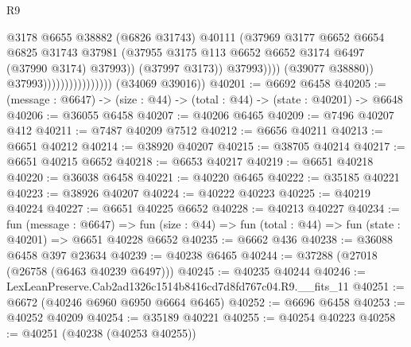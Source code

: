\begin{lexlean}{R9}
\begin{coremodule}
                                                  @3178
                                                  @6655
                                                  @38882
                                                  (@6826 @31743)
                                                  @40111
                                                  (@37969
                                                    @3177
                                                    @6652
                                                    @6654
                                                    @6825
                                                    @31743
                                                    @37981
                                                    (@37955
                                                      @3175
                                                      @113
                                                      @6652
                                                      @6652
                                                      @3174
                                                      @6497
                                                      (@37990 @3174)
                                                      @37993))
                                                  (@37997 @3173))
                                                @37993))))
                                        (@39077 @38880))
                                      @37993))))))))))))))))
      (@34069 @39016))
@40201 := @6692 @6458
@40205 := (message : @6647) -> (size : @44) -> (total : @44) -> (state : @40201) -> @6648
@40206 := @36055 @6458
@40207 := @40206 @6465
@40209 := @7496 @40207 @412
@40211 := @7487 @40209 @7512
@40212 := @6656 @40211
@40213 := @6651 @40212
@40214 := @38920 @40207
@40215 := @38705 @40214
@40217 := @6651 @40215 @6652
@40218 := @6653 @40217
@40219 := @6651 @40218
@40220 := @36038 @6458
@40221 := @40220 @6465
@40222 := @35185 @40221
@40223 := @38926 @40207
@40224 := @40222 @40223
@40225 := @40219 @40224
@40227 := @6651 @40225 @6652
@40228 := @40213 @40227
@40234 := fun (message : @6647) =>
  fun (size : @44) => fun (total : @44) => fun (state : @40201) => @6651 @40228 @6652
@40235 := @6662 @436
@40238 := @36088 @6458 @397 @23634
@40239 := @40238 @6465
@40244 := @37288 (@27018 (@26758 (@6463 @40239 @6497)))
@40245 := @40235 @40244
@40246 := LexLeanPreserve.Cab2ad1326c1514b8416cd7d8fd767c04.R9.__fits_11
@40251 := @6672 (@40246 @6960 @6950 @6664 @6465)
@40252 := @6696 @6458
@40253 := @40252 @40209
@40254 := @35189 @40221
@40255 := @40254 @40223
@40258 := @40251 (@40238 (@40253 @40255))

\end{coremodule}
\end{lexlean}

